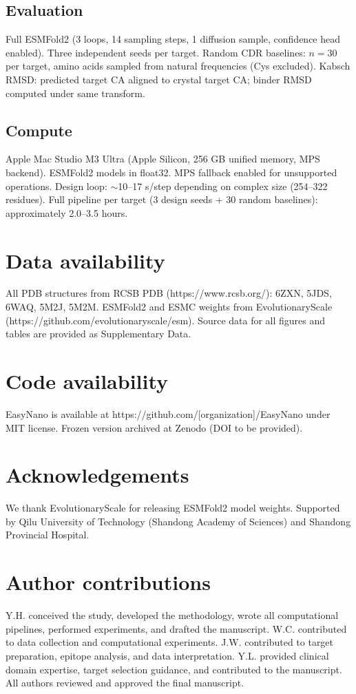 \documentclass[11pt,a4paper]{article}
\begin{document}
\subsection{Evaluation}
Full ESMFold2 (3 loops, 14 sampling steps, 1 diffusion sample, confidence head enabled). Three independent seeds per target. Random CDR baselines: $n=30$ per target, amino acids sampled from natural frequencies (Cys excluded). Kabsch RMSD: predicted target CA aligned to crystal target CA; binder RMSD computed under same transform.

\subsection{Compute}
Apple Mac Studio M3 Ultra (Apple Silicon, 256 GB unified memory, MPS backend). ESMFold2 models in float32. MPS fallback enabled for unsupported operations. Design loop: $\sim$10--17 s/step depending on complex size (254--322 residues). Full pipeline per target (3 design seeds + 30 random baselines): approximately 2.0--3.5 hours.

\section*{Data availability}
All PDB structures from RCSB PDB (https://www.rcsb.org/): 6ZXN, 5JDS, 6WAQ, 5M2J, 5M2M. ESMFold2 and ESMC weights from EvolutionaryScale (https://github.com/evolutionaryscale/esm). Source data for all figures and tables are provided as Supplementary Data.

\section*{Code availability}
EasyNano is available at https://github.com/[organization]/EasyNano under MIT license. Frozen version archived at Zenodo (DOI to be provided).

\section*{Acknowledgements}
We thank EvolutionaryScale for releasing ESMFold2 model weights. Supported by Qilu University of Technology (Shandong Academy of Sciences) and Shandong Provincial Hospital.

\section*{Author contributions}
Y.H. conceived the study, developed the methodology, wrote all computational pipelines, performed experiments, and drafted the manuscript. W.C. contributed to data collection and computational experiments. J.W. contributed to target preparation, epitope analysis, and data interpretation. Y.L. provided clinical domain expertise, target selection guidance, and contributed to the manuscript. All authors reviewed and approved the final manuscript.
\end{document}
